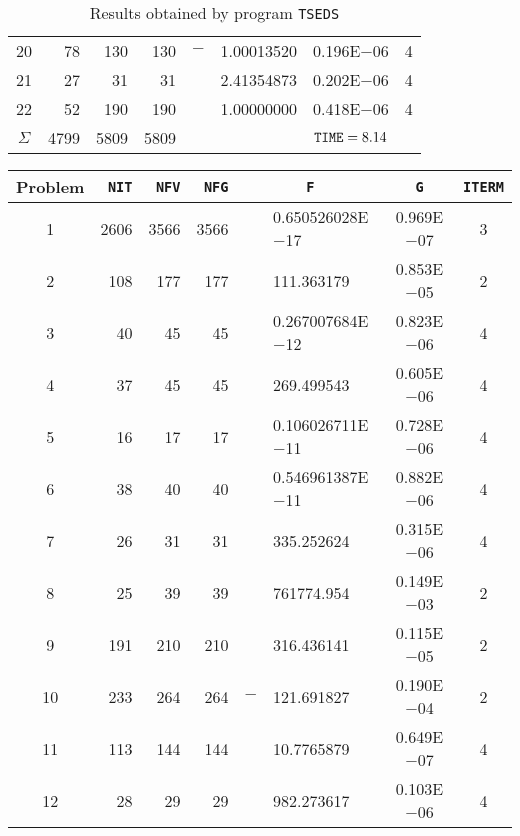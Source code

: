 \documentclass{esub2acm}
\begin{document}
\begin{table}
\begin{tabular}{c|rrrr@{}lcc}
20  &   78  &   130 &   130 &   $-$ &   1.00013520  &   0.196E$-$06 &   4   \\
21  &   27  &   31  &   31  &       &   2.41354873  &   0.202E$-$06 &   4   \\
22  &   52  &   190 &   190 &       &   1.00000000  &   0.418E$-$06 &   4   \\ \hline
$\Sigma$\rule[-2pt]{0pt}{12pt}  &   4799    &   5809    &   5809    &       &       &   ${\tt TIME} = 8.14$ &       \\ \hline
\end{tabular}
\caption{Results obtained by program {\tt TSEDS}}
\label{tseds}
\end{table}

\clearpage

\begin{table}
\footnotesize
\centering
\begin{tabular}{c|rrrr@{}lcc} \hline
Problem\rule[-2pt]{0pt}{12pt} & {\tt NIT} & {\tt NFV} & {\tt NFG} & \multicolumn{2}{c}{\tt F} & {\tt G} & {\tt ITERM} \\ \hline
1\rule[-2pt]{0pt}{12pt} &   2606    &   3566    &   3566    &       &   0.650526028E$-$17   &   0.969E$-$07 &   3   \\
2   &   108 &   177 &   177 &       &   111.363179  &   0.853E$-$05 &   2   \\
3   &   40  &   45  &   45  &       &   0.267007684E$-$12   &   0.823E$-$06 &   4   \\
4   &   37  &   45  &   45  &       &   269.499543  &   0.605E$-$06 &   4   \\
5   &   16  &   17  &   17  &       &   0.106026711E$-$11   &   0.728E$-$06 &   4   \\
6   &   38  &   40  &   40  &       &   0.546961387E$-$11   &   0.882E$-$06 &   4   \\
7   &   26  &   31  &   31  &       &   335.252624  &   0.315E$-$06 &   4   \\
8   &   25  &   39  &   39  &       &   761774.954  &   0.149E$-$03 &   2   \\
9   &   191 &   210 &   210 &       &   316.436141  &   0.115E$-$05 &   2   \\
10  &   233 &   264 &   264 &   $-$ &   121.691827  &   0.190E$-$04 &   2   \\
11  &   113 &   144 &   144 &       &   10.7765879  &   0.649E$-$07 &   4   \\
12  &   28  &   29  &   29  &       &   982.273617  &   0.103E$-$06 &   4   \\

\end{tabular}
\end{table}
\end{document}
